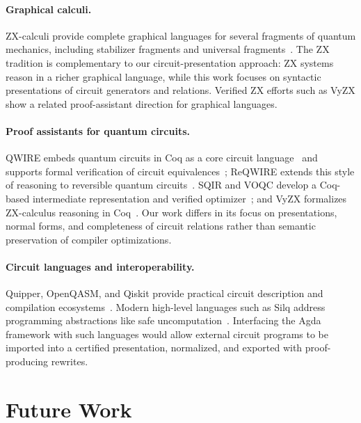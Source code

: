 \documentclass[acmsmall,screen,review,anonymous]{acmart}
\newcommand{\Agda}{Agda\xspace}
\begin{document}
\paragraph{Graphical calculi.}
ZX-calculi provide complete graphical languages for several fragments of
quantum mechanics, including stabilizer fragments and universal
fragments~\cite{CoeckeDuncan2011,Backens2014,JeandelPerdrixVilmart2018}. The
ZX tradition is complementary to our circuit-presentation approach: ZX systems
reason in a richer graphical language, while this work focuses on syntactic
presentations of circuit generators and relations. Verified ZX efforts such as
VyZX show a related proof-assistant direction for graphical languages.

\paragraph{Proof assistants for quantum circuits.}
QWIRE embeds quantum circuits in Coq as a core circuit
language~\cite{PaykinRandZdancewic2017QWIRE} and supports formal verification
of circuit equivalences~\cite{RandPaykinZdancewic2018QWIRE}; ReQWIRE extends
this style of reasoning to reversible quantum circuits~\cite{RandPaykinLeeZdancewic2019ReQWIRE}.
SQIR and VOQC develop a Coq-based intermediate representation and verified
optimizer~\cite{HietalaEtAl2021VOQC}; and VyZX formalizes ZX-calculus reasoning
in Coq~\cite{LehmannCaldwellRand2022VyZX,LehmannEtAl2023VyZX}. Our work
differs in its focus on presentations, normal forms, and completeness of
circuit relations rather than semantic preservation of compiler optimizations.

\paragraph{Circuit languages and interoperability.}
Quipper, OpenQASM, and Qiskit provide practical circuit description and
compilation ecosystems~\cite{Selinger2004QPL,GreenEtAl2013Quipper,CrossEtAl2022OpenQASM3,Wille2019Qiskit}.
Modern high-level languages such as Silq address programming abstractions like
safe uncomputation~\cite{BichselEtAl2020Silq}.
Interfacing the \Agda framework with such languages would allow external circuit
programs to be imported into a certified presentation, normalized, and exported
with proof-producing rewrites.

\section{Future Work}
\end{document}
